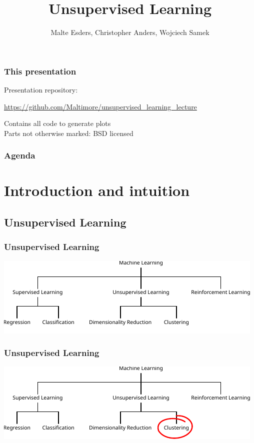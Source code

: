 \documentclass[Nike]{tuberlinbeamer}
\title{Unsupervised Learning}
\author{Malte Esders, Christopher Anders, Wojciech Samek}
\institute{Technische Universität Berlin - Machine Learning Group}
\begin{document}
\frame{\titlepage}


\begin{frame}
  \frametitle{This presentation}
  Presentation repository: \\
  \begin{center}
    \url{https://github.com/Maltimore/unsupervised_learning_lecture}\\
  \end{center}
  Contains all code to generate plots\\
  Parts not otherwise marked: BSD licensed
\end{frame}

\begin{frame}
  \frametitle{Agenda}
  \setcounter{tocdepth}{1}
  \tableofcontents
\end{frame}


\section{Introduction and intuition}
\subsection{Unsupervised Learning}

\begin{frame}
 \frametitle{Unsupervised Learning}
  \begin{center}
    \vfill
    \includegraphics[width=\textwidth]{ml_schema}
    \vfill
  \end{center}
\end{frame}

\begin{frame}
 \frametitle{Unsupervised Learning}
  \begin{center}
    \vfill
    \includegraphics[width=\textwidth]{ml_schema_sel}
    \vfill
  \end{center}
\end{frame}
\end{document}
